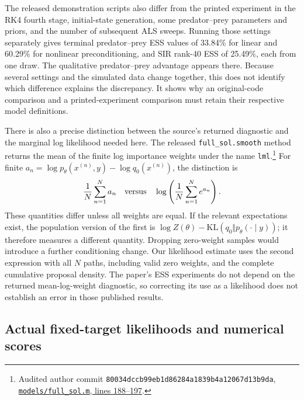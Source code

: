 The released demonstration scripts also differ from the printed experiment
in the RK4 fourth stage, initial-state generation, some predator--prey
parameters and priors, and the number of subsequent ALS sweeps.  Running those
settings separately gives terminal predator--prey ESS values of 33.84\% for
linear and 60.29\% for nonlinear preconditioning, and SIR rank-40 ESS of
25.49\%, each from one draw.  The qualitative predator--prey advantage appears
there.  Because several settings and the simulated data change together, this
does not identify which difference explains the discrepancy.  It shows why
an original-code comparison and a printed-experiment comparison must retain
their respective model definitions.

There is also a precise distinction between the source's returned diagnostic
and the marginal log likelihood needed here.  The released
\texttt{full\_sol.smooth} method returns the mean of the finite log importance
weights under the name \texttt{lml}.\footnote{Audited author commit
\texttt{80034dccb99eb1d86284a1839b4a12067d13b9da},
\href{https://github.com/DeepTransport/tensor-ssm-paper-demo/blob/80034dccb99eb1d86284a1839b4a12067d13b9da/models/full_sol.m\#L188-L197}{\texttt{models/full\_sol.m}, lines 188--197}.}
For finite $a_n=\log p_\theta(x^{(n)},y)-\log q_0(x^{(n)})$, the distinction is
\begin{equation}
  \frac1N\sum_{n=1}^N a_n
  \quad\hbox{versus}\quad
  \log\left(\frac1N\sum_{n=1}^N e^{a_n}\right).
  \label{eq:bf-hd-source-logweight-distinction}
\end{equation}
These quantities differ unless all weights are equal.  If the relevant
expectations exist, the population version of the first is
$\log Z(\theta)-\mathrm{KL}(q_0\Vert p_\theta(\cdot\mid y))$;
it therefore measures a different quantity.  Dropping zero-weight samples
would introduce a further conditioning change.  Our likelihood estimate uses
the second expression with all $N$ paths, including valid zero weights,
and the complete cumulative proposal density.  The paper's ESS experiments
do not depend on the returned mean-log-weight diagnostic, so correcting its
use as a likelihood does not establish an error in those published results.


\subsection{Actual fixed-target likelihoods and numerical scores}
\label{sec:bf-hd-final-score-values}

